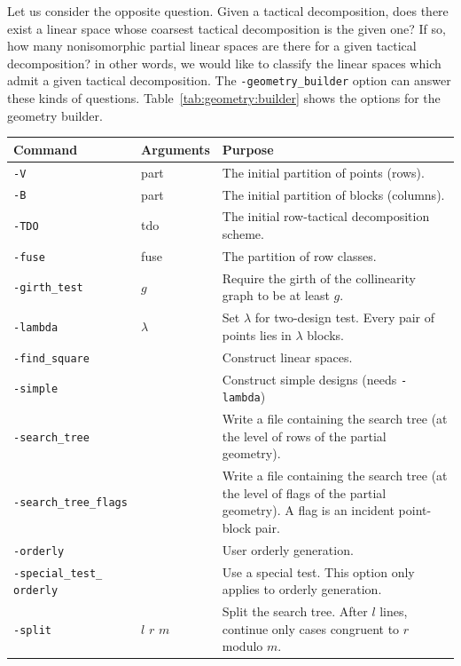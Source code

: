 Let us consider the opposite question. 
Given a tactical decomposition, does there exist a linear space
whose coarsest tactical decomposition is the given one? 
If so, how many nonisomorphic partial linear spaces are there 
for a given tactical decomposition? 
in other words, we would like to classify the linear spaces which admit a given tactical decomposition.
The \verb'-geometry_builder' option can answer these kinds of questions. 
Table~\ref{tab:geometry:builder} shows the options for the geometry builder.
\begin{table}
	\begin{center}
	\begin{tabular}{|p{4cm}|p{3cm}|p{7cm}|}
		\hline
		Command & Arguments & Purpose \\
		\hline
		\hline
		\verb'-V' & part  & The initial partition of points (rows). \\
		\hline
		\verb'-B' & part & The initial partition of blocks (columns). \\
		\hline
		\verb'-TDO' & tdo & The initial row-tactical decomposition scheme. \\
		\hline
		\verb'-fuse' & fuse & The partition of row classes. \\
		\hline
		\verb'-girth_test' & $g$ & Require the girth of the collinearity graph to be at least $g$. \\
		\hline
		\verb'-lambda' & $\lambda$ & Set $\lambda$ for two-design test. Every pair of points lies in $\lambda$ blocks. \\
		\hline
		\verb'-find_square' &  &  Construct linear spaces. \\
		\hline
		\verb'-simple' &  & Construct simple designs (needs \verb'-lambda') \\
		\hline
		\verb'-search_tree' &  & Write a file containing the search tree (at the level of rows of the partial geometry). \\
		\hline
		\verb'-search_tree_flags' &  & Write a file containing the search tree (at the level of flags of the partial geometry). A flag is an incident point-block pair. \\
		\hline
		\verb'-orderly' &  & User orderly generation. \\
		\hline
		\verb'-special_test_' \verb'orderly' &  & Use a special test. This option only applies to orderly generation. \\
		\hline
		\verb'-split' & $l$ $r$ $m$ & Split the search tree. After $l$ lines, continue only cases congruent to $r$ modulo $m$. \\

\end{tabular}
\end{center}
\end{table}
